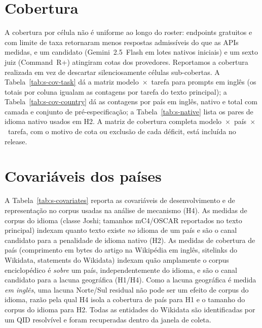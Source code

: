 \documentclass[11pt,a4paper]{article}
\begin{document}


\section{Cobertura}

A cobertura por célula não é uniforme ao longo do roster: endpoints gratuitos e com
limite de taxa retornaram menos respostas admissíveis do que as APIs medidas, e um
candidato (Gemini~2.5~Flash em lotes nativos iniciais) e um sexto juiz
(Command~R+) atingiram cotas dos provedores. Reportamos a cobertura realizada em
vez de descartar silenciosamente células sub-cobertas. A
Tabela~\ref{tab:s-cov-task} dá a matriz modelo~$\times$~tarefa para prompts em
inglês (os totais por coluna igualam as contagens por tarefa do texto principal);
a Tabela~\ref{tab:s-cov-country} dá as contagens por país em inglês, nativo e total
com camada e conjunto de pré-especificação; a Tabela~\ref{tab:s-native} lista os pares
de idioma nativo usados em H2. A matriz de cobertura completa
modelo~$\times$~país~$\times$~tarefa, com o motivo de cota ou exclusão de cada
déficit, está incluída no release.





\section{Covariáveis dos países}

A Tabela~\ref{tab:s-covariates} reporta as covariáveis de desenvolvimento e de
representação no corpus usadas na análise de mecanismo (H4). As medidas de
corpus do idioma (classe Joshi; tamanhos mC4/OSCAR reportados no texto
principal) indexam quanto texto existe \emph{no} idioma de um país e são o canal
candidato para a penalidade de idioma nativo (H2). As medidas de
cobertura de país (comprimento em bytes do artigo na Wikipédia em inglês,
sitelinks do Wikidata, statements do Wikidata) indexam quão amplamente o corpus
enciclopédico é \emph{sobre} um país, independentemente do idioma, e são o canal
candidato para a lacuna geográfica (H1/H4). Como a lacuna geográfica é medida
\emph{em inglês}, uma lacuna Norte/Sul residual não pode ser um efeito de corpus do
idioma, razão pela qual H4 isola a cobertura de país para H1 e o tamanho do corpus
do idioma para H2. Todas as entidades do Wikidata são identificadas por um QID
resolvível e foram recuperadas dentro da janela de coleta.
\end{document}
